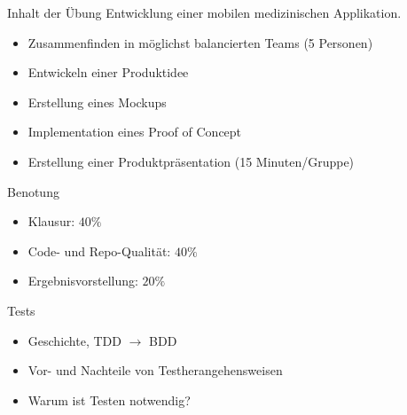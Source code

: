 \documentclass[aspectratio=169,t]{beamer}
\begin{document}
\begin{frame}{Inhalt der Übung}
Entwicklung einer mobilen medizinischen Applikation.
    \begin{itemize}
        \item<2-> Zusammenfinden in möglichst balancierten Teams (5 Personen)
        \item<3-> Entwickeln einer Produktidee
        \item<4-> Erstellung eines Mockups
        \item<5-> Implementation eines Proof of Concept
        \item<6-> Erstellung einer Produktpräsentation (15 Minuten/Gruppe)
    \end{itemize}
\end{frame}

\begin{frame}{Benotung}
 \begin{itemize}
     \item<1-> Klausur: $40\%$
     \item<2-> Code- und Repo-Qualität: $40\%$
     \item<4-> Ergebnisvorstellung: $20\%$
 \end{itemize}
\end{frame}

\begin{frame}{Tests}
 \begin{itemize}
     \item Geschichte, TDD $\rightarrow$ BDD
     \item Vor- und Nachteile von Testherangehensweisen
     \item Warum ist Testen notwendig?
 \end{itemize}
\end{frame}
\end{document}
